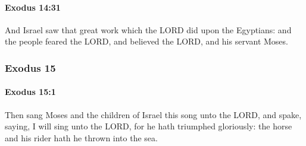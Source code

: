 		\paragraph{Exodus 14:31} %
			\label{EXODUS-14-31}

			And Israel saw that great work which the LORD did upon the Egyptians: and the people feared the LORD, and believed the LORD, and his servant Moses.

	\subsubsection{Exodus 15} %
		\label{EXODUS-15}

		\paragraph{Exodus 15:1} %
			\label{EXODUS-15-1}

			Then sang Moses and the children of Israel this song unto the LORD, and spake, saying, I will sing unto the LORD, for he hath triumphed gloriously: the horse and his rider hath he thrown into the sea.

